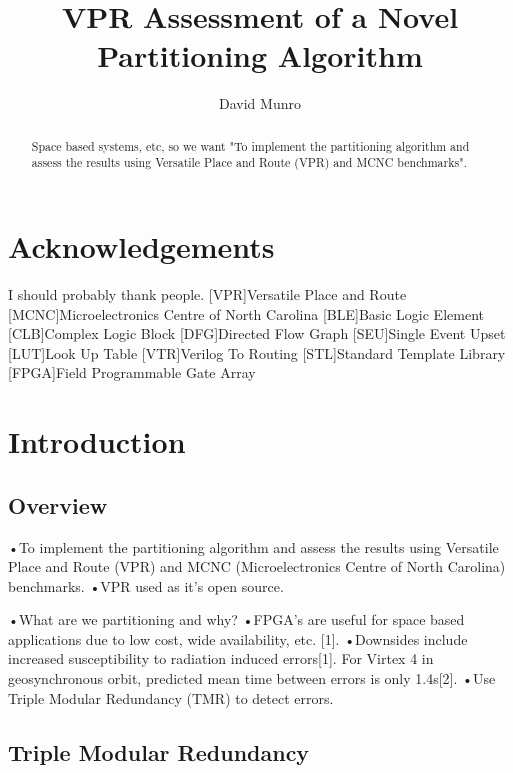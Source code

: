 \documentclass[12pt,draft,a4paper,oneside]{memoir} %
\title{VPR Assessment of a Novel Partitioning Algorithm}
\author{David Munro}
\begin{document}
\maketitle
\begin{abstract}
	Space based systems, etc, so we want "To implement the partitioning algorithm and assess the results using Versatile Place and Route (VPR) and MCNC benchmarks".
\end{abstract}
\chapter*{Acknowledgements}
I should probably thank people.
\newpage
{}[VPR]{Versatile Place and Route}
[MCNC]{Microelectronics Centre of North Carolina}
[BLE]{Basic Logic Element}
[CLB]{Complex Logic Block}
[DFG]{Directed Flow Graph}
[SEU]{Single Event Upset}
[LUT]{Look Up Table}
[VTR]{Verilog To Routing}
[STL]{Standard Template Library}
[FPGA]{Field Programmable Gate Array}
\tableofcontents*
\chapter{Introduction}
\section{Overview}
•To implement the partitioning algorithm and assess the results using Versatile Place and Route (VPR) and MCNC (Microelectronics Centre of North Carolina) benchmarks.
•VPR used as it’s open source.

•What are we partitioning and why?
•FPGA’s are useful for space based applications due to low cost, wide availability, etc. [1].
•Downsides include increased susceptibility to radiation induced errors[1]. For Virtex 4 in geosynchronous orbit, predicted mean time between errors is only 1.4s[2].
•Use Triple Modular Redundancy (TMR) to detect errors.

\section{Triple Modular Redundancy}
\end{document}
